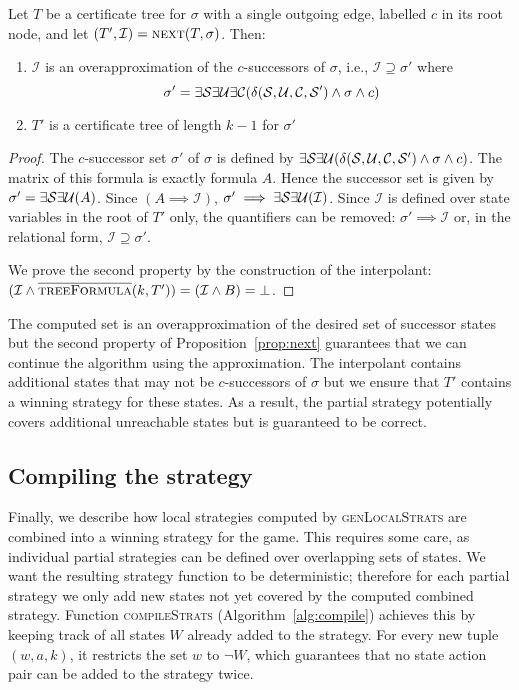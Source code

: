 \begin{proposition}\label{prop:next}
    Let $T$ be a certificate tree for $\sigma$ with a single outgoing edge, labelled $c$ in its root node, and let $(T',\mathcal{I})
    = \textsc{next}(T,\sigma)$.
    Then:
    \begin{enumerate}
        \item $\mathcal{I}$ is an overapproximation of the $c$-successors of $\sigma$, i.e., $\mathcal{I} \supseteq \sigma'$ where $$\sigma' = \exists \mathcal{S} \exists \mathcal{U} \exists \mathcal{C} (\delta(\mathcal{S}, \mathcal{U}, \mathcal{C}, \mathcal{S}') \land \sigma \land c)$$
        \item $T'$ is a certificate tree of length $k-1$ for $\sigma'$
    \end{enumerate}
\end{proposition}
\begin{proof}
    The $c$-successor set $\sigma'$ of $\sigma$ is defined by $\exists \mathcal{S} \exists \mathcal{U} (\delta(\mathcal{S}, \mathcal{U}, \mathcal{C}, \mathcal{S}') \land \sigma \land c)$. The matrix of this formula is exactly formula $A$.  Hence the successor set is given by $\sigma' = \exists \mathcal{S} \exists \mathcal{U} (A)$.  Since $(A \implies \mathcal{I})$, $\sigma' \implies \exists \mathcal{S} \exists \mathcal{U} (\mathcal{I})$.  Since $\mathcal{I}$ is defined over state variables in the root of $T'$ only, the quantifiers can be removed: $\sigma' \implies \mathcal{I}$ or, in the relational form, $\mathcal{I} \supseteq \sigma'$.
    
    We prove the second property by the construction of the interpolant: $(\mathcal{I} \land \textsc{$\overline{\mbox{treeFormula}}$}(k, T')) = (\mathcal{I} \land B) = \bot$.
\end{proof}

The computed set is an overapproximation of the desired set of successor states but the second property of Proposition~\ref{prop:next} guarantees that we can continue the algorithm using the approximation. The interpolant contains additional states that may not be $c$-successors of $\sigma$ but we ensure that $T'$ contains a winning strategy for these states. As a result, the partial strategy potentially covers additional unreachable states but is guaranteed to be correct.

\subsection{Compiling the strategy}

Finally, we describe how local strategies computed by \textsc{genLocalStrats} are combined into a winning strategy for the game.  This requires some care, as individual partial strategies can be defined over overlapping sets of states.  We want the resulting strategy function to be deterministic; therefore for each partial strategy we only add new states not yet covered by the computed combined strategy.  Function \textsc{compileStrats} (Algorithm~\ref{alg:compile}) achieves this by keeping track of all states $W$ already added to the strategy.  For every new tuple $(w, a, k)$, it restricts the set $w$ to $\neg W$, which guarantees that no state action pair can be added to the strategy twice.  


